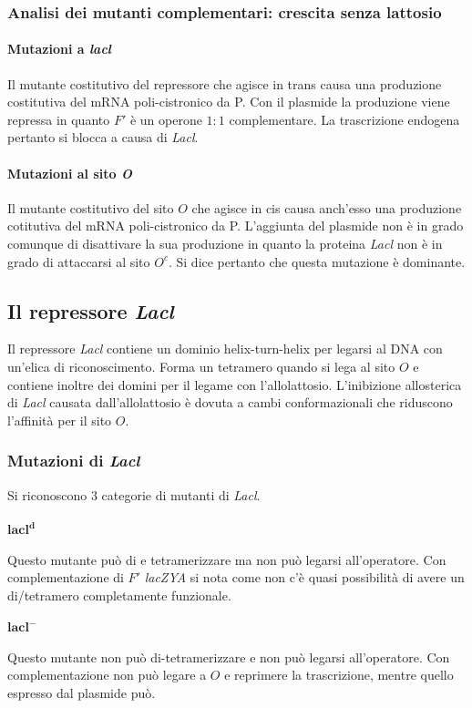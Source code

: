 \subsubsection{Analisi dei mutanti complementari: crescita senza lattosio}
\paragraph{Mutazioni a \emph{lacl}}
Il mutante costitutivo del repressore che agisce in trans causa una produzione costitutiva del mRNA poli-cistronico da P. Con il plasmide la produzione viene repressa in quanto 
$F'$  \`e un operone $1:1$ complementare. La trascrizione endogena pertanto si blocca a causa di \emph{Lacl}.
\paragraph{Mutazioni al sito \emph{O}}
Il mutante costitutivo del sito $O$ che agisce in cis causa anch'esso una produzione cotitutiva del mRNA poli-cistronico da P. L'aggiunta del plasmide non \`e in grado comunque di 
disattivare la sua produzione in quanto la proteina \emph{Lacl} non \`e in grado di attaccarsi al sito $O^c$. Si dice pertanto che questa mutazione \`e dominante. 
\subsection{Il repressore \emph{Lacl}}
Il repressore \emph{Lacl} contiene un dominio helix-turn-helix per legarsi al DNA con un'elica di riconoscimento. Forma un tetramero quando si lega al sito $O$ e contiene inoltre dei 
domini per il legame con l'allolattosio. L'inibizione allosterica di \emph{Lacl} causata dall'allolattosio \`e dovuta a cambi conformazionali che riduscono l'affinit\`a per il sito 
$O$.
\subsubsection{Mutazioni di \emph{Lacl}}
Si riconoscono $3$ categorie di mutanti di \emph{Lacl}.
\paragraph{$\mathbf{lacl^d}$}
Questo mutante pu\`o di e tetramerizzare ma non pu\`o legarsi all'operatore. Con complementazione di $F'$ \emph{lacZYA} si nota come non c'\`e quasi possibilit\`a di avere un 
di/tetramero completamente funzionale.
\paragraph{$\mathbf{lacl^-}$}
Questo mutante non pu\`o di-tetramerizzare e non pu\`o legarsi all'operatore. Con complementazione non pu\`o legare a $O$ e reprimere la trascrizione, mentre quello espresso dal plasmide
pu\`o. 
